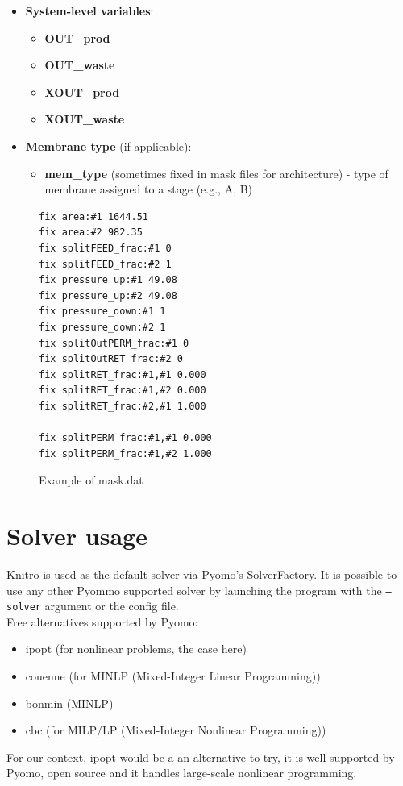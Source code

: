 \documentclass[12pt]{article}
\theoremstyle{definition}
\theoremstyle{definition}
\theoremstyle{remark}
\theoremstyle{remark}
\theoremstyle{definition}
\theoremstyle{remark}
\begin{document}
\begin{itemize}
\item \textbf{System-level variables}:
\begin{itemize}
  \item \textbf{OUT\_prod}
  \item \textbf{OUT\_waste}
  \item \textbf{XOUT\_prod}
  \item \textbf{XOUT\_waste}
\end{itemize}

\item \textbf{Membrane type} (if applicable):
	\begin{itemize}
  \item \textbf{mem\_type }(sometimes fixed in mask files for architecture) - type of membrane assigned to a stage (e.g., A, B)
	\end{itemize}


\end{itemize}
\begin{figure}[ht]
	
\begin{mdframed}
	\begin{verbatim}
fix area:#1 1644.51
fix area:#2 982.35
fix splitFEED_frac:#1 0
fix splitFEED_frac:#2 1
fix pressure_up:#1 49.08
fix pressure_up:#2 49.08
fix pressure_down:#1 1
fix pressure_down:#2 1
fix splitOutPERM_frac:#1 0
fix splitOutRET_frac:#2 0
fix splitRET_frac:#1,#1 0.000
fix splitRET_frac:#1,#2 0.000
fix splitRET_frac:#2,#1 1.000

fix splitPERM_frac:#1,#1 0.000
fix splitPERM_frac:#1,#2 1.000
	\end{verbatim}
	
\end{mdframed}
	\caption{Example of mask.dat}
\end{figure}

\section{Solver usage}
Knitro is used as the default solver via Pyomo's SolverFactory. It is possible to use any other Pyommo supported solver by launching the program with the \texttt{--solver} argument or the config file. \\
Free alternatives supported by Pyomo: 
\begin{itemize}
	\item ipopt (for nonlinear problems, the case here)
	\item couenne (for MINLP (Mixed-Integer Linear Programming))
	\item bonmin (MINLP)
	\item cbc (for MILP/LP (Mixed-Integer Nonlinear Programming))
\end{itemize}
For our context, ipopt would be a an alternative to try, it is well supported by Pyomo, open source and it handles large-scale nonlinear programming.
\end{document}
